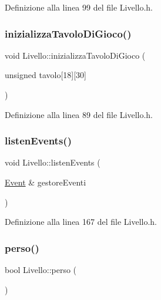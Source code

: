Definizione alla linea 99 del file Livello.\+h.

\mbox{\label{class_livello_aa3021f607bb87dd293cabbac08b97475}} 
\subsubsection{\texorpdfstring{inizializza\+Tavolo\+Di\+Gioco()}{inizializzaTavoloDiGioco()}}
{\footnotesize\ttfamily void Livello\+::inizializza\+Tavolo\+Di\+Gioco (\begin{DoxyParamCaption}\item[{unsigned}]{tavolo\mbox{[}18\mbox{]}\mbox{[}30\mbox{]} }\end{DoxyParamCaption})\hspace{0.3cm}{\ttfamily [inline]}}



Definizione alla linea 89 del file Livello.\+h.

\mbox{\label{class_livello_a10eeb00ce588d7ef1e61450cf6f48ae5}} 
\subsubsection{\texorpdfstring{listen\+Events()}{listenEvents()}}
{\footnotesize\ttfamily void Livello\+::listen\+Events (\begin{DoxyParamCaption}\item[{\hyperlink{class_event}{Event} \&}]{gestore\+Eventi }\end{DoxyParamCaption})\hspace{0.3cm}{\ttfamily [inline]}}



Definizione alla linea 167 del file Livello.\+h.

\mbox{\label{class_livello_aedb65253d415e1c5a184c173237a089f}} 
\subsubsection{\texorpdfstring{perso()}{perso()}}
{\footnotesize\ttfamily bool Livello\+::perso (\begin{DoxyParamCaption}{ }\end{DoxyParamCaption})\hspace{0.3cm}{\ttfamily [inline]}}



